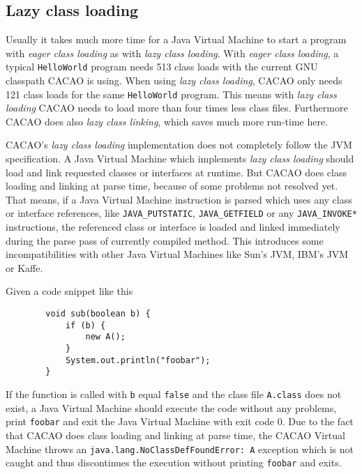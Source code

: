 \subsection{Lazy class loading}
\label{sectionlazyclassloading}

Usually it takes much more time for a Java Virtual Machine to start a
program with \textit{eager class loading} as with \textit{lazy class
loading}. With \textit{eager class loading}, a typical
\texttt{HelloWorld} program needs 513 class loads with the current GNU
classpath CACAO is using. When using \textit{lazy class loading},
CACAO only needs 121 class loads for the same \texttt{HelloWorld}
program. This means with \textit{lazy class loading} CACAO needs to
load more than four times less class files. Furthermore CACAO does
also \textit{lazy class linking}, which saves much more run-time here.

CACAO's \textit{lazy class loading} implementation does not completely
follow the JVM specification. A Java Virtual Machine which implements
\textit{lazy class loading} should load and link requested classes or
interfaces at runtime. But CACAO does class loading and linking at
parse time, because of some problems not resolved yet. That means, if
a Java Virtual Machine instruction is parsed which uses any class or
interface references, like \texttt{JAVA\_PUTSTATIC},
\texttt{JAVA\_GETFIELD} or any \texttt{JAVA\_INVOKE*} instructions,
the referenced class or interface is loaded and linked immediately
during the parse pass of currently compiled method. This introduces
some incompatibilities with other Java Virtual Machines like Sun's
JVM, IBM's JVM or Kaffe.

Given a code snippet like this

\begin{verbatim}
        void sub(boolean b) {
            if (b) {
                new A();
            }
            System.out.println("foobar");
        }
\end{verbatim}

If the function is called with \texttt{b} equal \texttt{false} and the
class file \texttt{A.class} does not exist, a Java Virtual Machine
should execute the code without any problems, print \texttt{foobar}
and exit the Java Virtual Machine with exit code 0. Due to the fact
that CACAO does class loading and linking at parse time, the CACAO
Virtual Machine throws an \texttt{java.lang.NoClassDefFoundError:~A}
exception which is not caught and thus discontinues the execution
without printing \texttt{foobar} and exits.

